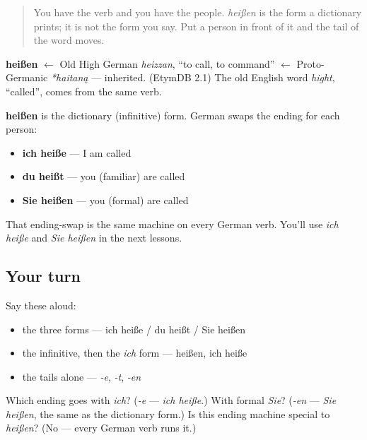 \label{lesson:GE-C02-heissen-endungen}



\begin{quote}
You have the verb and you have the people. \emph{heißen} is the form a dictionary prints; it is not the form you say. Put a person in front of it and the tail of the word moves.
\end{quote}

\begin{cousinweb}
\textbf{heißen} $\leftarrow$ Old High German \emph{heizzan}, \textquotedblleft{}to call, to command\textquotedblright{} $\leftarrow$ Proto-Germanic \emph{*haitaną} — inherited. (EtymDB 2.1) The old English word \emph{hight}, \textquotedblleft{}called\textquotedblright{}, comes from the same verb.
\end{cousinweb}

\begin{grammarlens}[title={Grammar Lens: one verb, changing its ending}]
\textbf{heißen} is the dictionary (infinitive) form. German swaps the ending for each person:

\begin{itemize}
\raggedright
  \item \textbf{ich heiße} — I am called
  \item \textbf{du heißt} — you (familiar) are called
  \item \textbf{Sie heißen} — you (formal) are called
\end{itemize}

That ending-swap is the same machine on every German verb. You'll use \emph{ich heiße} and \emph{Sie heißen} in the next lessons.
\end{grammarlens}

\subsection*{Your turn}
Say these aloud:

\begin{itemize}
\raggedright
  \item the three forms — ich heiße / du heißt / Sie heißen
  \item the infinitive, then the \emph{ich} form — heißen, ich heiße
  \item the tails alone — \emph{-e}, \emph{-t}, \emph{-en}
\end{itemize}

\begin{tcolorbox}[breakable,colback=teal!4,colframe=teal!35!black,title={Before you move on}]
Which ending goes with \emph{ich}? (\emph{-e} — \emph{ich heiße}.) With formal \emph{Sie}? (\emph{-en} — \emph{Sie heißen}, the same as the dictionary form.) Is this ending machine special to \emph{heißen}? (No — every German verb runs it.)
\end{tcolorbox}
